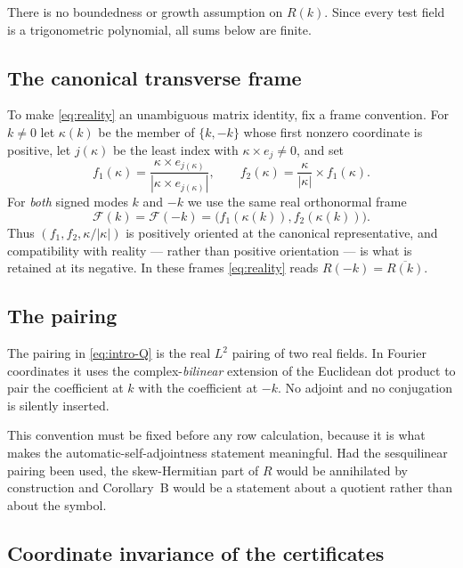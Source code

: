 \documentclass[11pt]{article}
\theoremstyle{definition}
\theoremstyle{remark}
\theoremstyle{plain}
\begin{document}
There is no boundedness or growth assumption on $R(k)$. Since every test
field is a trigonometric polynomial, all sums below are finite.

\subsection{The canonical transverse frame}

To make \eqref{eq:reality} an unambiguous matrix identity, fix a frame
convention. For $k\ne0$ let $\kappa(k)$ be the member of $\{k,-k\}$ whose
first nonzero coordinate is positive, let $j(\kappa)$ be the least index with
$\kappa\times e_{j}\ne0$, and set
\begin{equation}
\label{eq:frame}
f_{1}(\kappa)
=\frac{\kappa\times e_{j(\kappa)}}{|\kappa\times e_{j(\kappa)}|},
\qquad
f_{2}(\kappa)=\frac{\kappa}{|\kappa|}\times f_{1}(\kappa).
\end{equation}
For \emph{both} signed modes $k$ and $-k$ we use the same real orthonormal
frame
\begin{equation}
\label{eq:sameframe}
\mathcal F(k)=\mathcal F(-k)
=\bigl(f_{1}(\kappa(k)),f_{2}(\kappa(k))\bigr).
\end{equation}
Thus $(f_{1},f_{2},\kappa/|\kappa|)$ is positively oriented at the canonical
representative, and compatibility with reality --- rather than positive
orientation --- is what is retained at its negative. In these frames
\eqref{eq:reality} reads $R(-k)=\overline{R(k)}$.

\subsection{The pairing}
\label{subsec:pairing}

The pairing in \eqref{eq:intro-Q} is the real $L^{2}$ pairing of two real
fields. In Fourier coordinates it uses the complex-\emph{bilinear} extension
of the Euclidean dot product to pair the coefficient at $k$ with the
coefficient at $-k$. No adjoint and no conjugation is silently inserted.

This convention must be fixed before any row calculation, because it is what
makes the automatic-self-adjointness statement meaningful. Had the
sesquilinear pairing been used, the skew-Hermitian part of $R$ would be
annihilated by construction and Corollary~B would be a statement about a
quotient rather than about the symbol.

\subsection{Coordinate invariance of the certificates}
\end{document}
